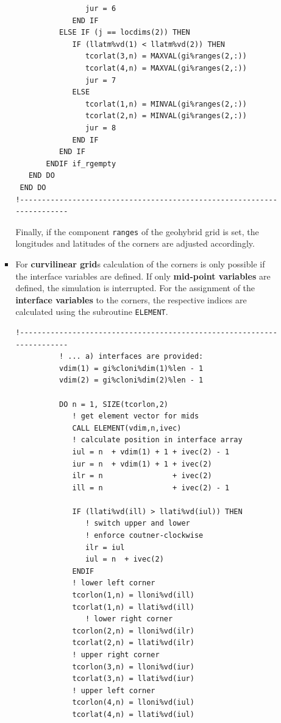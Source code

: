 \documentclass[11pt,twoside]{article}
\begin{document}
\begin{enumerate}
\begin{itemize}
\begin{itemize}
\begin{verbatim}
                jur = 6
             END IF
          ELSE IF (j == locdims(2)) THEN
             IF (llatm%vd(1) < llatm%vd(2)) THEN
                tcorlat(3,n) = MAXVAL(gi%ranges(2,:))
                tcorlat(4,n) = MAXVAL(gi%ranges(2,:))
                jur = 7
             ELSE
                tcorlat(1,n) = MINVAL(gi%ranges(2,:))
                tcorlat(2,n) = MINVAL(gi%ranges(2,:))
                jur = 8
             END IF
          END IF
       ENDIF if_rgempty
   END DO
 END DO
!-----------------------------------------------------------------------
\end{verbatim}
Finally, if the component \verb|ranges| of the geohybrid grid is set,
the longitudes and latitudes of the corners are adjusted accordingly.

\item For {\bf curvilinear grid}s calculation of the corners is
only possible if the interface variables are defined. If only {\bf
mid-point variables} are defined, the simulation is interrupted.
For the assignment of the {\bf interface variables} to the corners,
the respective indices are calculated using the subroutine \verb|ELEMENT|.
\begin{verbatim}
!-----------------------------------------------------------------------
          ! ... a) interfaces are provided:
          vdim(1) = gi%cloni%dim(1)%len - 1 
          vdim(2) = gi%cloni%dim(2)%len - 1

          DO n = 1, SIZE(tcorlon,2)
             ! get element vector for mids
             CALL ELEMENT(vdim,n,ivec) 
             ! calculate position in interface array
             iul = n  + vdim(1) + 1 + ivec(2) - 1
             iur = n  + vdim(1) + 1 + ivec(2)    
             ilr = n                + ivec(2)
             ill = n                + ivec(2) - 1

             IF (llati%vd(ill) > llati%vd(iul)) THEN
                ! switch upper and lower
                ! enforce coutner-clockwise
                ilr = iul
                iul = n  + ivec(2)
             ENDIF
             ! lower left corner
             tcorlon(1,n) = lloni%vd(ill) 
             tcorlat(1,n) = llati%vd(ill) 
                ! lower right corner
             tcorlon(2,n) = lloni%vd(ilr) 
             tcorlat(2,n) = llati%vd(ilr) 
             ! upper right corner
             tcorlon(3,n) = lloni%vd(iur) 
             tcorlat(3,n) = llati%vd(iur) 
             ! upper left corner
             tcorlon(4,n) = lloni%vd(iul) 
             tcorlat(4,n) = llati%vd(iul) 


\end{verbatim}
\end{itemize}
\end{itemize}
\end{enumerate}
\end{document}
